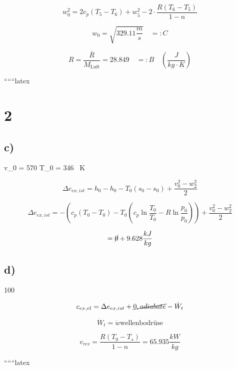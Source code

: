 \[
w_0^2 = 2 c_p \left( T_5 - T_6 \right) + w_5^2 - 2 \cdot \frac{R \left( T_6 - T_5 \right)}{1 - n}
\]

\[
w_0 = \sqrt{329.11 \frac{m}{s}} \quad =: C
\]

\[
R = \frac{\bar{R}}{M_{\text{Luft}}} = 28.849 \quad =: B \quad \left( \frac{J}{kg \cdot K} \right)
\]

``````latex


\section*{2}

\subsection*{c)}
 v_0 = 570  \quad T_0 = 346 \, K

\[
\Delta e_{ex, ist} = h_0 - h_0 - T_0 (s_0 - s_0) + \frac{v_0^2 - w_2^2}{2}
\]

\[
\Delta e_{ex, ist} = - (c_p (T_0 - T_0) - T_0 (c_p \ln \frac{T_0}{T_0} - R \ln \frac{p_0}{p_0})) + \frac{v_0^2 - w_2^2}{2}
\]

\[
= \cancel{0} + 9.628 \frac{kJ}{kg}
\]

\subsection*{d)}
 100 


\[
c_{ex, el} = \Delta e_{ex, ist} + \cancel{0, adiabate} - \dot{W}_t
\]

\[
\dot{W}_t = \dot{w} \text{wellenbodrüse}
\]

\[
v_{rev} = \frac{R (T_0 - T_s)}{1 - n} = 65.935 \frac{kW}{kg}
\]

``````latex


